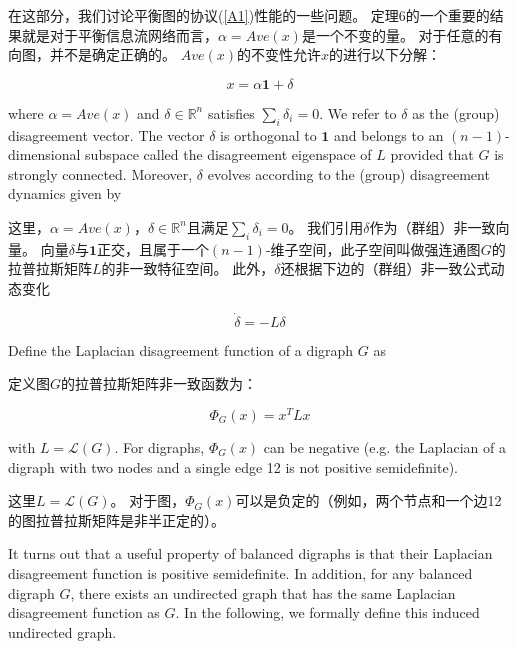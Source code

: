 \documentclass{article}
\begin{document}
\noindent 在这部分，我们讨论平衡图的协议(\ref{A1})性能的一些问题。
定理6的一个重要的结果就是对于平衡信息流网络而言，$\alpha = Ave(x)$是一个不变的量。
对于任意的有向图，并不是确定正确的。
$Ave(x)$的不变性允许$x$的进行以下分解：

\begin{equation}
    x = \alpha \mathbf{1} + \delta
    \tag{22}
    \label{22}
\end{equation}

{\color[gray]{0.5}
\noindent where $\alpha = Ave(x)$ and $\delta\in \mathbb{R}^n$ satisﬁes $\sum_i\delta_i=0$. 
We refer to $\delta$ as the (group) disagreement vector. 
The vector $\delta$ is orthogonal to $\mathbf{1}$ and belongs to an $(n-1)$-dimensional subspace called the disagreement eigenspace of $L$ provided that $G$ is strongly connected. 
Moreover, $\delta$ evolves according to the (group) disagreement dynamics given by
}

\noindent 这里，$\alpha = Ave(x)$，$\delta\in \mathbb{R}^n$且满足$\sum_i\delta_i=0$。
我们引用$\delta$作为（群组）非一致向量。
向量$\delta$与$\mathbf{1}$正交，且属于一个$(n-1)$-维子空间，此子空间叫做强连通图$G$的拉普拉斯矩阵$L$的非一致特征空间。
此外，$\delta$还根据下边的（群组）非一致公式动态变化

\begin{equation}
    \dot{\delta} = -L\delta
    \tag{23}
    \label{23}
\end{equation}

{\color[gray]{0.5}
Deﬁne the Laplacian disagreement function of a digraph $G$ as
}

定义图$G$的拉普拉斯矩阵非一致函数为：

\begin{equation}
    \Phi_G(x) = x^T Lx
    \tag{24}
    \label{24}
\end{equation}

{\color[gray]{0.5}
\noindent with $L=\mathcal{L}(G)$. 
For digraphs, $\Phi_G(x)$ can be negative (e.g. the Laplacian of a digraph with two nodes and a single edge 12 is not positive semideﬁnite).
}

\noindent 这里$L=\mathcal{L}(G)$。
对于图，$\Phi_G(x)$可以是负定的（例如，两个节点和一个边12的图拉普拉斯矩阵是非半正定的）。

{\color[gray]{0.5}
It turns out that a useful property of balanced digraphs is that their Laplacian disagreement function is positive semideﬁnite. 
In addition, for any balanced digraph $G$, there exists an undirected graph that has the same Laplacian disagreement function as $G$. 
In the following, we formally deﬁne this induced undirected graph.
}
\end{document}
